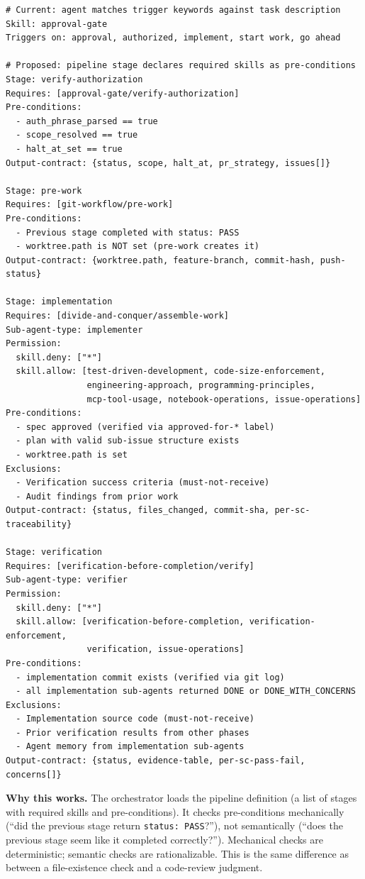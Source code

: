 \documentclass[11pt,a4paper]{article}
\begin{document}
\begin{lstlisting}[style=pseudocode, language={}]
# Current: agent matches trigger keywords against task description
Skill: approval-gate
Triggers on: approval, authorized, implement, start work, go ahead

# Proposed: pipeline stage declares required skills as pre-conditions
Stage: verify-authorization
Requires: [approval-gate/verify-authorization]
Pre-conditions:
  - auth_phrase_parsed == true
  - scope_resolved == true
  - halt_at_set == true
Output-contract: {status, scope, halt_at, pr_strategy, issues[]}

Stage: pre-work
Requires: [git-workflow/pre-work]
Pre-conditions:
  - Previous stage completed with status: PASS
  - worktree.path is NOT set (pre-work creates it)
Output-contract: {worktree.path, feature-branch, commit-hash, push-status}

Stage: implementation
Requires: [divide-and-conquer/assemble-work]
Sub-agent-type: implementer
Permission:
  skill.deny: ["*"]
  skill.allow: [test-driven-development, code-size-enforcement,
                engineering-approach, programming-principles,
                mcp-tool-usage, notebook-operations, issue-operations]
Pre-conditions:
  - spec approved (verified via approved-for-* label)
  - plan with valid sub-issue structure exists
  - worktree.path is set
Exclusions:
  - Verification success criteria (must-not-receive)
  - Audit findings from prior work
Output-contract: {status, files_changed, commit-sha, per-sc-traceability}

Stage: verification
Requires: [verification-before-completion/verify]
Sub-agent-type: verifier
Permission:
  skill.deny: ["*"]
  skill.allow: [verification-before-completion, verification-enforcement,
                verification, issue-operations]
Pre-conditions:
  - implementation commit exists (verified via git log)
  - all implementation sub-agents returned DONE or DONE_WITH_CONCERNS
Exclusions:
  - Implementation source code (must-not-receive)
  - Prior verification results from other phases
  - Agent memory from implementation sub-agents
Output-contract: {status, evidence-table, per-sc-pass-fail, concerns[]}
\end{lstlisting}

\begin{insightbox}
\textbf{Why this works.}  The orchestrator loads the pipeline definition (a list of stages with required skills and pre-conditions).  It checks pre-conditions mechanically (``did the previous stage return \texttt{status: PASS}?''), not semantically (``does the previous stage seem like it completed correctly?'').  Mechanical checks are deterministic; semantic checks are rationalizable.  This is the same difference as between a file-existence check and a code-review judgment.
\end{insightbox}
\end{document}
